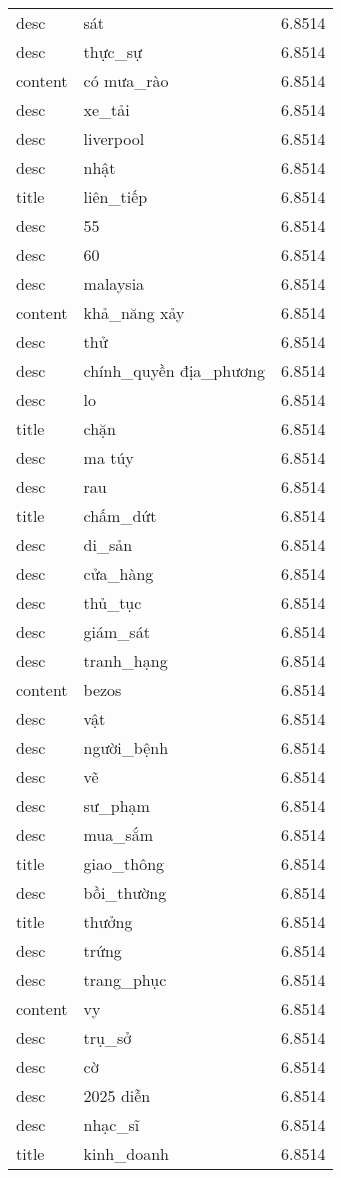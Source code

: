 \documentclass{article}
\begin{document}
\begin{tabular}{lll}
desc & sát & 6.8514\\
desc & thực\_sự & 6.8514\\
content & có mưa\_rào & 6.8514\\
desc & xe\_tải & 6.8514\\
desc & liverpool & 6.8514\\
desc & nhật & 6.8514\\
title & liên\_tiếp & 6.8514\\
desc & 55 & 6.8514\\
desc & 60 & 6.8514\\
desc & malaysia & 6.8514\\
content & khả\_năng xảy & 6.8514\\
desc & thử & 6.8514\\
desc & chính\_quyền địa\_phương & 6.8514\\
desc & lo & 6.8514\\
title & chặn & 6.8514\\
desc & ma túy & 6.8514\\
desc & rau & 6.8514\\
title & chấm\_dứt & 6.8514\\
desc & di\_sản & 6.8514\\
desc & cửa\_hàng & 6.8514\\
desc & thủ\_tục & 6.8514\\
desc & giám\_sát & 6.8514\\
desc & tranh\_hạng & 6.8514\\
content & bezos & 6.8514\\
desc & vật & 6.8514\\
desc & người\_bệnh & 6.8514\\
desc & vẽ & 6.8514\\
desc & sư\_phạm & 6.8514\\
desc & mua\_sắm & 6.8514\\
title & giao\_thông & 6.8514\\
desc & bồi\_thường & 6.8514\\
title & thưởng & 6.8514\\
desc & trứng & 6.8514\\
desc & trang\_phục & 6.8514\\
content & vy & 6.8514\\
desc & trụ\_sở & 6.8514\\
desc & cờ & 6.8514\\
desc & 2025 diễn & 6.8514\\
desc & nhạc\_sĩ & 6.8514\\
title & kinh\_doanh & 6.8514\\

\end{tabular}
\end{document}
